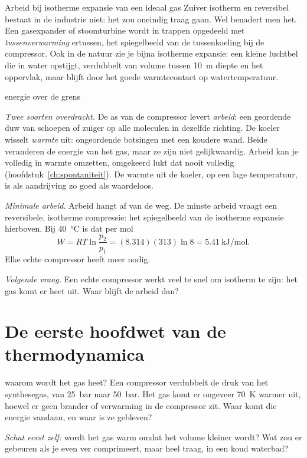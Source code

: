 \begin{voorbeeld}{Arbeid bij isotherme expansie van een ideaal gas}
Zuiver isotherm en reversibel bestaat in de industrie niet: het zou oneindig traag gaan. Wel benadert men het. Een gasexpander of stoomturbine wordt in trappen opgedeeld met \emph{tussenverwarming} ertussen, het spiegelbeeld van de tussenkoeling bij de compressor. Ook in de natuur zie je bijna isotherme expansie: een kleine luchtbel die in water opstijgt, verdubbelt van volume tussen \SI{10}{\metre} diepte en het oppervlak, maar blijft door het goede warmtecontact op watertemperatuur.
\end{voorbeeld}

\begin{casusuitgewerkt}{energie over de grens}

\emph{Twee soorten overdracht.} De as van de compressor levert \emph{arbeid}: een geordende duw van schoepen of zuiger op alle moleculen in dezelfde richting. De koeler wisselt \emph{warmte} uit: ongeordende botsingen met een koudere wand. Beide veranderen de energie van het gas, maar ze zijn niet gelijkwaardig. Arbeid kan je volledig in warmte omzetten, omgekeerd lukt dat nooit volledig (hoofdstuk~\ref{ch:spontaniteit}). De warmte uit de koeler, op een lage temperatuur, is als aandrijving zo goed als waardeloos.

\emph{Minimale arbeid.} Arbeid hangt af van de weg. De minste arbeid vraagt een reversibele, isotherme compressie: het spiegelbeeld van de isotherme expansie hierboven. Bij \SI{40}{\celsius} is dat per mol
\[
W = RT\ln\frac{p_2}{p_1} = (8.314)(313)\ln 8 = \SI{5.41}{\kilo\joule\per\mole}.
\]
Elke echte compressor heeft meer nodig.

\emph{Volgende vraag.} Een echte compressor werkt veel te snel om isotherm te zijn: het gas komt er heet uit. Waar blijft de arbeid dan?
\end{casusuitgewerkt}

\section{De eerste hoofdwet van de thermodynamica}

\begin{casus}{waarom wordt het gas heet?}
Een compressor verdubbelt de druk van het synthesegas, van \SI{25}{\bar} naar \SI{50}{\bar}. Het gas komt er ongeveer \SI{70}{\kelvin} warmer uit, hoewel er geen brander of verwarming in de compressor zit. Waar komt die energie vandaan, en waar is ze gebleven?

\emph{Schat eerst zelf:} wordt het gas warm omdat het volume kleiner wordt? Wat zou er gebeuren als je even ver comprimeert, maar heel traag, in een koud waterbad?
\end{casus}

